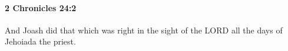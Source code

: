 
		\paragraph{2 Chronicles 24:2} %
			\label{2CHRONICLES-24-2}

			And Joash did that which was right in the sight of the LORD all the days of Jehoiada the priest.


